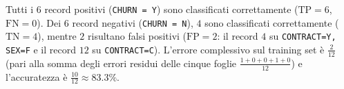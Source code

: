 Tutti i $6$ record positivi (\texttt{CHURN = Y}) sono classificati correttamente ($\text{TP} = 6$, $\text{FN} = 0$). Dei $6$ record negativi (\texttt{CHURN = N}), $4$ sono classificati correttamente ($\text{TN} = 4$), mentre $2$ risultano falsi positivi ($\text{FP} = 2$: il record $4$ su \texttt{CONTRACT=Y, SEX=F} e il record $12$ su \texttt{CONTRACT=C}). L'errore complessivo sul training set \`e $\frac{2}{12}$ (pari alla somma degli errori residui delle cinque foglie $\frac{1+0+0+1+0}{12}$) e l'accuratezza \`e $\frac{10}{12} \approx 83.3\%$.
